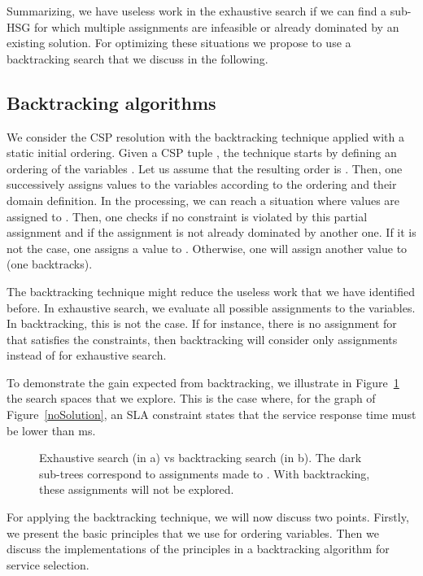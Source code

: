 \documentclass[a4paper]{article}
\begin{document}
Summarizing, we have useless work in the exhaustive search if we can find a sub-HSG for which 
multiple assignments are infeasible or already dominated by an existing solution. 
For optimizing these situations we propose to use a backtracking search that we discuss in the following. 

\subsection{Backtracking algorithms}


We consider the CSP resolution with the backtracking technique applied with a static initial ordering. 
Given a CSP tuple , the technique starts by defining an ordering of the 
variables . Let us assume that the resulting order is . Then, one successively 
assigns values to the variables according to the ordering and their domain definition. In the processing, 
we can reach a situation where values are assigned to  
. Then, one checks if no constraint is violated by this partial assignment and if the 
assignment is not already dominated by another one. 
If it is not the case, one assigns a value to . Otherwise, one will assign another 
value to  (one backtracks). 

The backtracking technique might reduce the useless work that we have identified before. In 
exhaustive search, we evaluate all possible assignments to the variables. 
In backtracking, this is not the case. If for instance, there is no assignment for  that 
satisfies the constraints, then backtracking will consider only  assignments instead of 
 for exhaustive search. 

To demonstrate the gain expected from  backtracking, we illustrate in Figure~\ref{backvsExh} the search spaces 
that we explore. This is the case where, for the graph of Figure~\ref{noSolution}, an SLA constraint states that the service response time must be lower than ms. 

\begin{figure}[htbp]
\centering
{}
\caption{Exhaustive search (in a) vs backtracking search (in b). The dark sub-trees correspond to 
assignments made to . With backtracking, these assignments will not be explored.}\label{backvsExh}
\end{figure}


For applying the backtracking technique, we will now discuss two points. Firstly, we present 
the basic principles that we use for ordering variables. Then we discuss the implementations 
of the principles in a backtracking algorithm for service selection.
\end{document}

